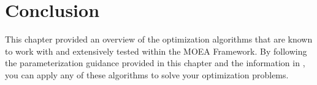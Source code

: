 \section{Conclusion}
This chapter provided an overview of the optimization algorithms that are known to work with and extensively tested within the MOEA Framework.  By following the parameterization guidance provided in this chapter and the information in , you can apply any of these algorithms to solve your optimization problems.
